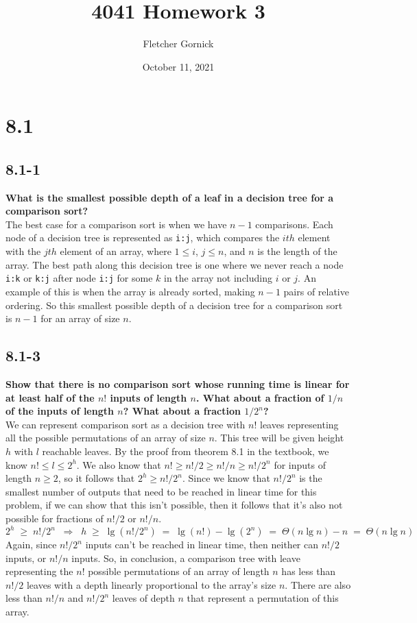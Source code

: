 \documentclass[11pt]{article}
\title{4041 Homework 3}
\author{Fletcher Gornick}
\date{October 11, 2021}
\begin{document}
 \maketitle 

 \section*{8.1}
 \subsection*{8.1-1}
 \textbf{What is the smallest possible depth of a leaf in a decision tree for a comparison 
 sort?} \\

 The best  case for a comparison sort is when we have $n-1$ comparisons.  Each 
 node of a decision tree is represented as \texttt{i:j}, which compares the $ith$ element with 
 the $jth$ element of an array, where $1 \leq i$, $j \leq n$, and $n$ is the length of the array.
 The best path along this decision tree is one where we never reach a node \texttt{i:k} or 
 \texttt{k:j} after node \texttt{i:j} for some $k$ in the array not including $i$ or $j$.  An 
 example of this is when the array is already sorted, making $n-1$ pairs of relative ordering. 
 So this smallest possible depth of a decision tree for a comparison sort is $n-1$ for an array 
 of size $n$.
 \newpage

 \subsection*{8.1-3}
 \textbf{Show that there is no comparison sort whose running time is linear for at least half 
 of the $n!$ inputs of length $n$. What about a fraction of $1/n$ of the inputs of length $n$? 
 What about a fraction $1/2^n$?} \\

 We can represent comparison sort as a decision tree with $n!$ leaves representing all the 
 possible permutations of an array of size $n$.  This tree will be given height $h$ with $l$
 reachable leaves.  By the proof from theorem 8.1 in the textbook, we know $n! \leq l \leq 2^h$. 
 We also know that $n! \geq n!/2 \geq n!/n \geq n!/2^n$ for inputs of length $n \geq 2$, so it 
 follows that $2^h \geq n!/2^n$.  Since we know that $n!/2^n$ is the smallest number of outputs 
 that need to be reached in linear time for this problem, if we can show that this isn't possible, 
 then it follows that it's also not possible for fractions of $n!/2$ or $n!/n$.
 $$2^h \;\geq\; n!/2^n \;\;\Rightarrow\;\; h \;\geq\; \lg(n!/2^n) \;=\; \lg(n!) - \lg(2^n) \;=\; 
 \Theta (n \lg n) - n \;=\; \Theta (n \lg n)$$
 Again, since $n!/2^n$ inputs can't be reached in linear time, then neither can $n!/2$ inputs, or 
 $n!/n$ inputs.
 So, in conclusion, a comparison tree with leave representing the $n!$ possible permutations of an 
 array of length $n$ has less than $n!/2$ leaves with a depth linearly proportional to the array's 
 size $n$.  There are also less than $n!/n$ and $n!/2^n$ leaves of depth $n$ that represent a 
 permutation of this array.
 \newpage
\end{document}
